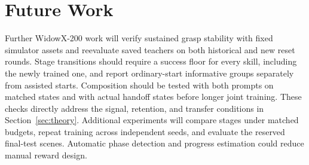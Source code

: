 \section{Future Work}\label{sec:future}
Further WidowX-200 work will verify sustained grasp stability with fixed simulator assets and reevaluate saved teachers on both historical and new reset rounds. Stage transitions should require a success floor for every skill, including the newly trained one, and report ordinary-start informative groups separately from assisted starts. Composition should be tested with both prompts on matched states and with actual handoff states before longer joint training. These checks directly address the signal, retention, and transfer conditions in Section~\ref{sec:theory}. Additional experiments will compare stages under matched budgets, repeat training across independent seeds, and evaluate the reserved final-test scenes. Automatic phase detection and progress estimation could reduce manual reward design.
